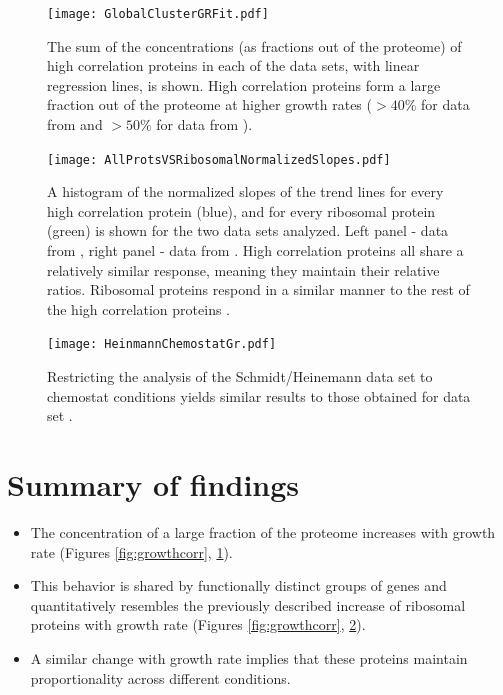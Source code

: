 \documentclass[a4paper,landscape,17pt]{extarticle}
\begin{document}
\begin{figure}[h]
\centering
\texttt{[image: GlobalClusterGRFit.pdf]}
\caption{\linespread{0.5}\selectfont{}
The sum of the concentrations (as fractions out of the proteome) of high correlation proteins in each of the data sets, with linear regression lines, is shown.
High correlation proteins form a large fraction out of the proteome at higher growth rates ($>40\%$ for data from \parencite{Heinemann2014} and $>50\%$ for data from \parencite{Valgepea2013}).
}

\label{fig:globalgrcorr}
\end{figure}
\clearpage        
\begin{figure}[h]
\centering
\texttt{[image: AllProtsVSRibosomalNormalizedSlopes.pdf]}
\caption{\linespread{0.5}\selectfont{}
    A histogram of the normalized slopes of the trend lines for every high correlation protein (blue), and for every ribosomal protein (green) is shown for the two data sets analyzed.
    Left panel - data from \parencite{Valgepea2013}, right panel - data from \parencite{Heinemann2014}.
    High correlation proteins all share a relatively similar response, meaning they maintain their relative ratios.
    Ribosomal proteins respond in a similar manner to the rest of the high correlation proteins .
}
\label{fig:globalfit}
\end{figure}
\clearpage        

\begin{figure}[h]
\centering
\texttt{[image: HeinmannChemostatGr.pdf]}
\caption{\linespread{0.5}\selectfont{}
  Restricting the analysis of the Schmidt/Heinemann data set to chemostat conditions yields similar results to those obtained for data set \parencite{Valgepea2013}.
}
\label{fig:growthcorrchemo}
\end{figure}
\clearpage        

\section*{Summary of findings}
\begin{itemize}
\item The concentration of a large fraction of the proteome increases with growth rate (Figures \ref{fig:growthcorr}, \ref{fig:globalgrcorr}).
\item This behavior is shared by functionally distinct groups of genes and quantitatively resembles the previously described increase of ribosomal proteins with growth rate (Figures \ref{fig:growthcorr}, \ref{fig:globalfit}).
\item A similar change with growth rate implies that these proteins maintain proportionality across different conditions.
\end{itemize}
\end{document}
